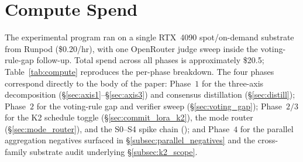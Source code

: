 \section{Compute Spend}
\label{app:compute}

The experimental program ran on a single RTX~4090 spot/on-demand
substrate from Runpod (\$0.20/hr), with one OpenRouter judge sweep
inside the voting-rule-gap follow-up.  Total spend across all
phases is approximately \$20.5; Table~\ref{tab:compute} reproduces
the per-phase breakdown.  The four phases correspond directly to
the body of the paper: Phase~$1$ for the three-axis decomposition
(\S\ref{sec:axis1}--\S\ref{sec:axis3}) and consensus distillation
(\S\ref{sec:distill}); Phase~$2$ for the voting-rule gap and
verifier sweep (\S\ref{sec:voting_gap}); Phase~$2/3$ for the K2
schedule toggle (\S\ref{sec:commit_lora_k2}), the mode router
(\S\ref{sec:mode_router}), and the S0--S4 spike chain
(); and Phase~$4$ for the parallel
aggregation negatives surfaced in
\S\ref{subsec:parallel_negatives} and the cross-family substrate
audit underlying \S\ref{subsec:k2_scope}.

